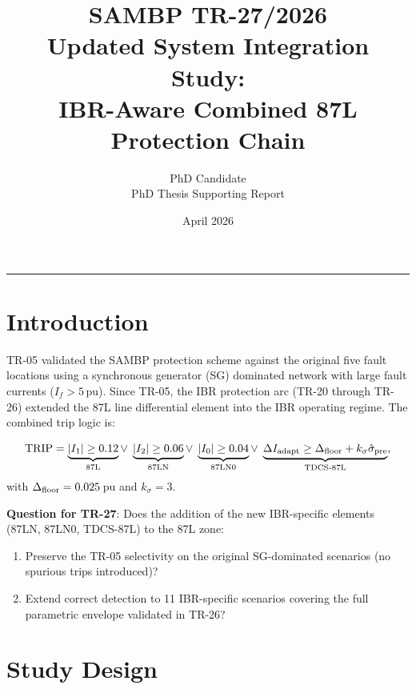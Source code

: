 \documentclass[11pt,a4paper]{article}
\title{%
  \textbf{SAMBP TR-27/2026}\\[4pt]
  Updated System Integration Study:\\
  IBR-Aware Combined 87L Protection Chain}
\author{PhD Candidate\\PhD Thesis Supporting Report}
\date{April 2026}
\begin{document}
\maketitle
\tableofcontents
\vspace{6pt}\hrule\vspace{10pt}

\section{Introduction}

TR-05 validated the SAMBP protection scheme against the original five fault
locations using a synchronous generator (SG) dominated network with large
fault currents ($I_f > 5\,\text{pu}$).  Since TR-05, the IBR protection arc
(TR-20 through TR-26) extended the 87L line differential element into the
IBR operating regime.  The combined trip logic is:

\begin{equation}
  \text{TRIP} =
    \underbrace{|I_1| \geq 0.12}_{\text{87L}}
    \vee\;
    \underbrace{|I_2| \geq 0.06}_{\text{87LN}}
    \vee\;
    \underbrace{|I_0| \geq 0.04}_{\text{87LN0}}
    \vee\;
    \underbrace{\Delta I_{\rm adapt} \geq
      \Delta_{\rm floor} + k_\sigma\hat{\sigma}_{\rm pre}}_{\text{TDCS-87L}},
  \label{eq:combined}
\end{equation}
with $\Delta_{\rm floor} = 0.025$\,pu and $k_\sigma = 3$.

\textbf{Question for TR-27}: Does the addition of the new IBR-specific
elements (87LN, 87LN0, TDCS-87L) to the 87L zone:
\begin{enumerate}
  \item Preserve the TR-05 selectivity on the original SG-dominated scenarios
    (no spurious trips introduced)?
  \item Extend correct detection to 11 IBR-specific scenarios covering the
    full parametric envelope validated in TR-26?
\end{enumerate}

\section{Study Design}
\end{document}
